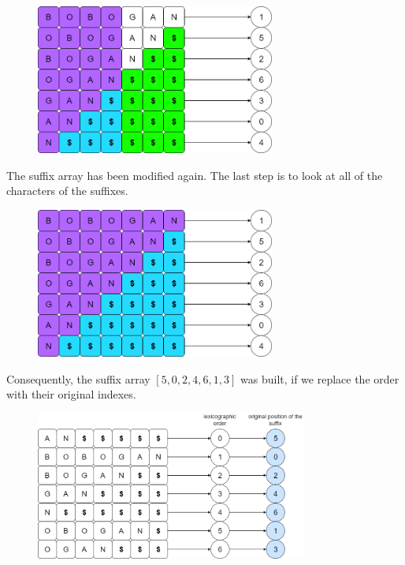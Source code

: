 \documentclass[letterpaper]{article}
\begin{document}
\newpage

\begin{figure} [h!]
\centering
\includegraphics[width=0.7\textwidth]{pngOfDiagrams/suffixarrayex4.png}
\end{figure}

The suffix array has been modified again. The last step is to look at all of the characters of the suffixes.

\begin{figure} [h!]
\centering
\includegraphics[width=0.7\textwidth]{pngOfDiagrams/suffixarrayex5.png}
\end{figure}

Consequently, the suffix array $[5, 0, 2, 4, 6, 1, 3]$ was built, if we replace the order with their original indexes.

\begin{figure} [h!]
\centering
\includegraphics[width=0.8\textwidth]{pngOfDiagrams/suffixarrayex6.png}
\end{figure}
\end{document}
